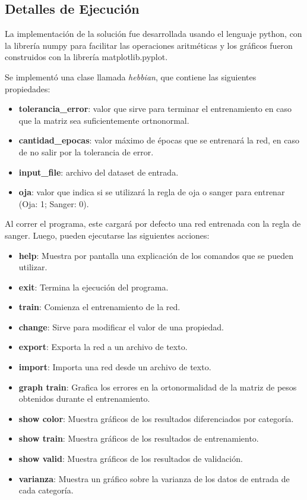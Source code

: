 \subsection{Detalles de Ejecución}

\par La implementación de la solución fue desarrollada usando el lenguaje python,
con la librería numpy para facilitar las operaciones aritméticas y los gráficos
fueron construidos con la librería matplotlib.pyplot.

\par Se implementó una clase llamada \textit{hebbian}, que contiene las siguientes propiedades:

\begin{itemize}
        \item \textbf{tolerancia\_error}: valor que sirve para terminar el entrenamiento en caso que la matriz sea suficientemente ortnonormal.
        \item \textbf{cantidad\_epocas}: valor máximo de épocas que se entrenará la red, en caso de no salir por la tolerancia de error.
        \item \textbf{input\_file}: archivo del dataset de entrada.
        \item \textbf{oja}: valor que indica si se utilizará la regla de oja o sanger para entrenar (Oja: 1; Sanger: 0).
\end{itemize}

\par Al correr el programa, este cargará por defecto una red entrenada con la regla de sanger. Luego, pueden ejecutarse las siguientes acciones:

\begin{itemize}
        \item \textbf{help}: Muestra por pantalla una explicación de los comandos que se pueden utilizar.
        \item \textbf{exit}: Termina la ejecución del programa.
        \item \textbf{train}: Comienza el entrenamiento de la red.
        \item \textbf{change}: Sirve para modificar el valor de una propiedad.
        \item \textbf{export}: Exporta la red a un archivo de texto.
        \item \textbf{import}: Importa una red desde un archivo de texto.
        \item \textbf{graph train}: Grafica los errores en la ortonormalidad de la matriz de pesos obtenidos durante el entrenamiento.
        \item \textbf{show color}: Muestra gráficos de los resultados diferenciados por categoría.
        \item \textbf{show train}: Muestra gráficos de los resultados de entrenamiento.
        \item \textbf{show valid}: Muestra gráficos de los resultados de validación.
        \item \textbf{varianza}: Muestra un gráfico sobre la varianza de los datos de entrada de cada categoría.
\end{itemize}


